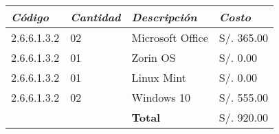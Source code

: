         \newpage

            \begin{table}[h!]
                \centering
                \begin{tabular}{|p{2.2cm}|p{1.8cm}|p{3.8cm}|p{2.2cm}|} \hline
                    
                
                \textit{{\bf{Código}}} &
                \textit{{\bf{Cantidad}}} &
                \textit{{\bf{Descripción}}} &
                \textit{{\bf{Costo}}}
                \\ \hline

                2.6.6.1.3.2 &
                02 &
                Microsoft Office &
                S/. 365.00
                \\ \hline

                2.6.6.1.3.2 &
                01 &
                Zorin OS &
                S/. 0.00
                \\ \hline

                2.6.6.1.3.2 &
                01 &
                Linux Mint &
                S/. 0.00
                \\ \hline

                2.6.6.1.3.2 &
                02 &
                Windows 10 &
                S/. 555.00
                \\ \hline

                &
                &
                \bf{Total} &
                S/. 920.00
                \\ \hline

                \end{tabular}
            \end{table}
